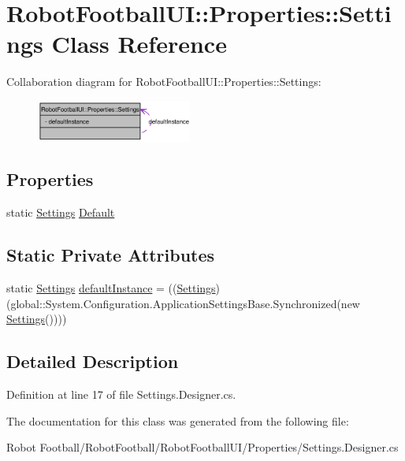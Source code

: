 \hypertarget{class_robot_football_u_i_1_1_properties_1_1_settings}{
\section{Robot\-Football\-UI::Properties::Settings Class Reference}
\label{class_robot_football_u_i_1_1_properties_1_1_settings}
}
Collaboration diagram for Robot\-Football\-UI::Properties::Settings:\begin{figure}[H]
\begin{center}
\leavevmode
\includegraphics[width=145pt]{class_robot_football_u_i_1_1_properties_1_1_settings__coll__graph}
\end{center}
\end{figure}
\subsection*{Properties}
\begin{CompactItemize}
\item 
\hypertarget{class_robot_football_u_i_1_1_properties_1_1_settings_9c86a9037a44d946973df6112ff874ba}{
static \hyperlink{class_robot_football_u_i_1_1_properties_1_1_settings}{Settings} \hyperlink{class_robot_football_u_i_1_1_properties_1_1_settings_9c86a9037a44d946973df6112ff874ba}{Default}}
\label{class_robot_football_u_i_1_1_properties_1_1_settings_9c86a9037a44d946973df6112ff874ba}

\end{CompactItemize}
\subsection*{Static Private Attributes}
\begin{CompactItemize}
\item 
\hypertarget{class_robot_football_u_i_1_1_properties_1_1_settings_c94243995c140c6a49651dd7941350b1}{
static \hyperlink{class_robot_football_u_i_1_1_properties_1_1_settings}{Settings} \hyperlink{class_robot_football_u_i_1_1_properties_1_1_settings_c94243995c140c6a49651dd7941350b1}{default\-Instance} = ((\hyperlink{class_robot_football_u_i_1_1_properties_1_1_settings}{Settings})(global::System.Configuration.Application\-Settings\-Base.Synchronized(new \hyperlink{class_robot_football_u_i_1_1_properties_1_1_settings}{Settings}())))}
\label{class_robot_football_u_i_1_1_properties_1_1_settings_c94243995c140c6a49651dd7941350b1}

\end{CompactItemize}


\subsection{Detailed Description}




Definition at line 17 of file Settings.Designer.cs.

The documentation for this class was generated from the following file:\begin{CompactItemize}
\item 
Robot Football/Robot\-Football/Robot\-Football\-UI/Properties/Settings.Designer.cs\end{CompactItemize}
